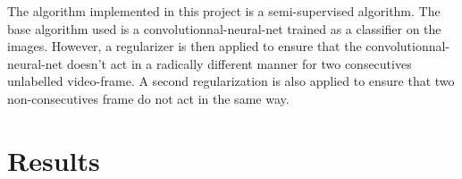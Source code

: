 \documentclass{article} %
\begin{document}
The algorithm implemented in this project is a semi-supervised algorithm. The base algorithm used is a convolutionnal-neural-net trained as a classifier on the images. However, a regularizer is then applied to ensure that the convolutionnal-neural-net doesn't act in a radically different manner for two consecutives unlabelled video-frame. A second regularization is also applied to ensure that two non-consecutives frame do not act in the same way.
\section{Results}
\end{document}
